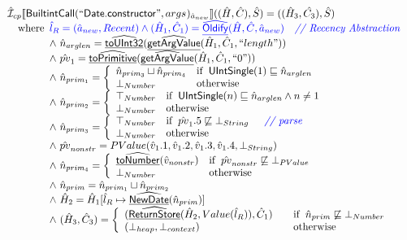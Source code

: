 \documentclass{article}
\newcommand{\SF}[1]{\mbox{\textsf{#1}}}
\newcommand{\comment}[1]{\textit{#1}}
\newcommand{\wherec}[1]{{\rm where}\begin{array}[t]{l}#1\end{array}}
\newcommand{\ifc}[1]{{\rm if}\begin{array}[t]{l}#1\end{array}}
\newcommand{\owc}{{\rm otherwise}}
\newcommand{\aI}{\hat{\mathcal{I}}}
\newcommand{\lbr}{\llbracket}
\newcommand{\rbr}{\rrbracket}
\newcommand{\ahf}[1]{\widehat{\underline{\sf #1}}}
\def\inblue{\color{blue}}
\def\inblue{\color{blue}}
\begin{document}
\[\begin{array}{l}
\aI _{cp}\lbr \SF{BuiltintCall}(``\SF{Date.constructor}",args_{})_{\hat{a}_{new}}\rbr((\hat{H},\hat{C}), \hat{S})
  = ((\hat{H}_3, \hat{C_3}), \hat{S})\\
\quad\wherec{
  \inblue\hat{l}_{R} = (\hat{a}_{new}, Recent)
  \land \inblue (\hat{H}_1, \hat{C}_1) = \ahf{Oldify}(\hat{H}, \hat{C}, \hat{a}_{new})
     \quad\comment{{\inblue // Recency Abstraction}}\\
  \land\ \hat{n}_{arglen} = \ahf{toUInt32}(\ahf{getArgValue}(\hat{H}_1, \hat{C}_1, ``length"))\\
  \land\ \hat{pv}_1 = \ahf{toPrimitive}(\ahf{getArgValue}(\hat{H}_1, \hat{C}_1, ``0"))\\
  \land\ \hat{n}_{prim_1} = \left\{\begin{array}{ll}
      \hat{n}_{prim_3} \sqcup \hat{n}_{prim_4}& \ifc{\SF{UIntSingle}(1) \sqsubseteq \hat{n}_{arglen}}\\
      \bot_{Number} & \owc\
    \end{array}\right.\\
  \land\ \hat{n}_{prim_2} = \left\{\begin{array}{ll}
      \top_{Number} & \ifc{\SF{UIntSingle}(n) \sqsubseteq \hat{n}_{arglen} \land n \neq 1}\\
      \bot_{Number} & \owc\
    \end{array}\right.\\
  \land\ \hat{n}_{prim_3} = \left\{\begin{array}{ll}
      \top_{Number} & \ifc{\hat{pv}_1.5 \not\sqsubseteq \bot_{String}}
        \quad\comment{{\inblue // parse}}\\
      \bot_{Number} & \owc\
    \end{array}\right.\\
  \land\ \hat{pv}_{nonstr} = PValue(\hat{v}_1.1,\hat{v}_1.2,\hat{v}_1.3,\hat{v}_1.4,\bot_{String})\\
  \land\ \hat{n}_{prim_4} = \left\{\begin{array}{ll}
      \ahf{toNumber}(\hat{v}_{nonstr}) & \ifc{\hat{pv}_{nonstr} \not\sqsubseteq \bot_{PValue}}\\
      \bot_{Number} & \owc\
    \end{array}\right.\\
  \land\ \hat{n}_{prim} = \hat{n}_{prim_1} \sqcup \hat{n}_{prim_2}\\
  \land\ \hat{H}_2 = \hat{H}_1[\hat{l}_R \mapsto \ahf{NewDate}(\hat{n}_{prim})]\\
  \land\ (\hat{H}_3, \hat{C}_3) = 
    \left\{\begin{array}{l@{\quad\quad}l}
      (\ahf{ReturnStore}(\hat{H}_2, Value(\hat{l}_R)), \hat{C}_1)
      & \ifc{\hat{n}_{prim} \not\sqsubseteq \bot_{Number}}\\
      (\bot_{heap}, \bot_{context}) & \owc \\
    \end{array}\right.\\
  }\\
\\\\



\end{array}\]
\end{document}
